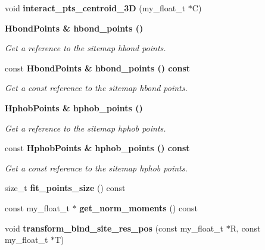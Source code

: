 \begin{CompactItemize}
\item 
void \textbf{interact\_\-pts\_\-centroid\_\-3D} (my\_\-float\_\-t $\ast$C)\label{classASCbase_1_1Sitemap_f6ea975d404459e84b1283b3d011434f}

\item 
\bf{Hbond\-Points} \& \bf{hbond\_\-points} ()\label{classASCbase_1_1Sitemap_007b084d4422bb7a72bdd63e309985ce}

\begin{CompactList}\small\item\em Get a reference to the sitemap hbond points. \item\end{CompactList}\item 
const \bf{Hbond\-Points} \& \bf{hbond\_\-points} () const \label{classASCbase_1_1Sitemap_d985aeaf02eedb866b67eb389e62df52}

\begin{CompactList}\small\item\em Get a const reference to the sitemap hbond points. \item\end{CompactList}\item 
\bf{Hphob\-Points} \& \bf{hphob\_\-points} ()\label{classASCbase_1_1Sitemap_ac2a508a7cb5843d2450b4261de23b93}

\begin{CompactList}\small\item\em Get a reference to the sitemap hphob points. \item\end{CompactList}\item 
const \bf{Hphob\-Points} \& \bf{hphob\_\-points} () const \label{classASCbase_1_1Sitemap_0ee5530e8852f95876a978e8c284f88f}

\begin{CompactList}\small\item\em Get a const reference to the sitemap hphob points. \item\end{CompactList}\item 
size\_\-t \textbf{fit\_\-points\_\-size} () const \label{classASCbase_1_1Sitemap_88f86e7f2f8a1a69a6e34a1b6b942216}

\item 
const my\_\-float\_\-t $\ast$ \textbf{get\_\-norm\_\-moments} () const \label{classASCbase_1_1Sitemap_df498664611c91d15cf7234d8ef91dbc}

\item 
void \textbf{transform\_\-bind\_\-site\_\-res\_\-pos} (const my\_\-float\_\-t $\ast$R, const my\_\-float\_\-t $\ast$T)\label{classASCbase_1_1Sitemap_22aa833d2798ec1ecc85f29444a60dc2}


\end{CompactItemize}
